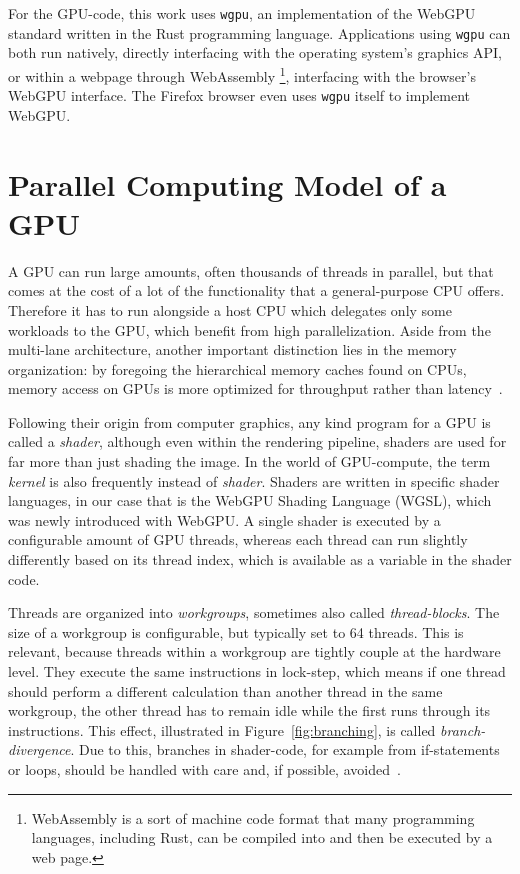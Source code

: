 For the GPU-code, this work uses \texttt{wgpu}, an implementation of the WebGPU
standard written in the Rust programming language.
Applications using \texttt{wgpu} can both run natively, directly interfacing with the
operating system's graphics API,
or within a webpage through WebAssembly%
\footnote{WebAssembly is a sort of machine code format that many programming
languages, including Rust, can be compiled into
and then be executed by a web page.},
interfacing with the browser's WebGPU interface.
The Firefox browser even uses \texttt{wgpu} itself to implement WebGPU\@.


\section{Parallel Computing Model of a GPU}\label{sec:gpu_model}

A GPU can run large amounts, often thousands of threads in parallel,
but that comes at the cost of a lot of the functionality
that a general-purpose CPU offers.
Therefore it has to run alongside a host CPU which delegates only some
workloads to the GPU, which benefit from high parallelization.
Aside from the multi-lane architecture, another important distinction lies in
the memory organization:
by foregoing the hierarchical memory caches found on CPUs,
memory access on GPUs is more optimized for throughput rather than
latency~\cite{Patterson2016}.

Following their origin from computer graphics, any kind program for a GPU is
called a \emph{shader}, although even within the rendering pipeline, shaders
are used for far more than just shading the image.
In the world of GPU-compute, the term \emph{kernel} is also frequently instead
of \emph{shader}.
Shaders are written in specific shader languages,
in our case that is the WebGPU Shading Language (WGSL),
which was newly introduced with WebGPU\@.
A single shader is executed by a configurable amount of GPU threads,
whereas each thread can run slightly differently based on its thread index,
which is available as a variable in the shader code.

Threads are organized into \emph{workgroups},
sometimes also called \emph{thread-blocks}.
The size of a workgroup is configurable,
but typically set to 64 threads.
This is relevant,
because threads within a workgroup are tightly couple at the hardware level.
They execute the same instructions in lock-step,
which means if one thread should perform a different calculation than another
thread in the same workgroup,
the other thread has to remain idle while the first runs through its
instructions.
This effect, illustrated in Figure~\ref{fig:branching}, is called
\emph{branch-divergence}.
Due to this, branches in shader-code,
for example from if-statements or loops,
should be handled with care and, if possible, avoided~\cite{Hijma2023}.


